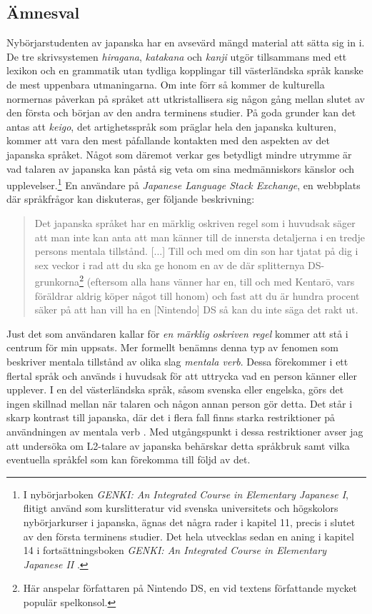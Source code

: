 \documentclass[12pt,a4paper]{article}
\begin{document}
\subsection{Ämnesval}
\label{sec:Inledning: Ämnesval}
Nybörjarstudenten av japanska har en avsevärd mängd material att sätta sig in i. De tre skrivsystemen \emph{hiragana}, \emph{katakana} och \emph{kanji} utgör tillsammans med ett lexikon och en grammatik utan tydliga kopplingar till västerländska språk kanske de mest uppenbara utmaningarna. Om inte förr så kommer de kulturella normernas påverkan på språket att utkristallisera sig någon gång mellan slutet av den första och början av den andra terminens studier. På goda grunder kan det antas att \emph{keigo}, det artighetsspråk som präglar hela den japanska kulturen, kommer att vara den mest påfallande kontakten med den aspekten av det japanska språket. Något som däremot verkar ges betydligt mindre utrymme är vad talaren av japanska kan påstå sig veta om sina medmänniskors känslor och upplevelser.\footnote{I nybörjarboken \emph{GENKI: An Integrated Course in Elementary Japanese I}, flitigt använd som kurslitteratur vid svenska universitets och högskolors nybörjarkurser i japanska, ägnas det några rader i kapitel 11, precis i slutet av den första terminens studier. Det hela utvecklas sedan en aning i kapitel 14 i fortsättningsboken \emph{GENKI: An Integrated Course in Elementary Japanese II} \autocite{banno2020a,banno2020b}.} En användare på \emph{Japanese Language Stack Exchange}, en webbplats där språkfrågor kan diskuteras, ger följande beskrivning:

\blockquote[{\cite{schaab2011}}]{Det japanska språket har en märklig oskriven regel som i huvudsak säger att man inte kan anta att man känner till de innersta detaljerna i en tredje persons mentala tillstånd. [...] Till och med om din son har tjatat på dig i sex veckor i rad att du ska ge honom en av de där splitternya \mbox{DS-grunkorna}\footnote{Här anspelar författaren på Nintendo DS, en vid textens författande mycket populär spelkonsol.} (eftersom alla hans vänner har en, till och med Kentarō, vars föräldrar aldrig köper något till honom) och fast att du är hundra procent säker på att han vill ha en [Nintendo] DS så kan du inte säga det rakt ut.}

\noindent
Just det som användaren kallar för \emph{en märklig oskriven regel} kommer att stå i centrum för min uppsats. Mer formellt benämns denna typ av fenomen som beskriver mentala tillstånd av olika slag \emph{mentala verb}. Dessa förekommer i ett flertal språk och används i huvudsak för att uttrycka vad en person känner eller upplever. I en del västerländska språk, såsom svenska eller engelska, görs det ingen skillnad mellan när talaren och någon annan person gör detta. Det står i skarp kontrast till japanska, där det i flera fall finns starka restriktioner på användningen av mentala verb \autocite{hasegawa2005}. Med utgångspunkt i dessa restriktioner avser jag att undersöka om L2-talare av japanska behärskar detta språkbruk samt vilka eventuella språkfel som kan förekomma till följd av det.
\end{document}
